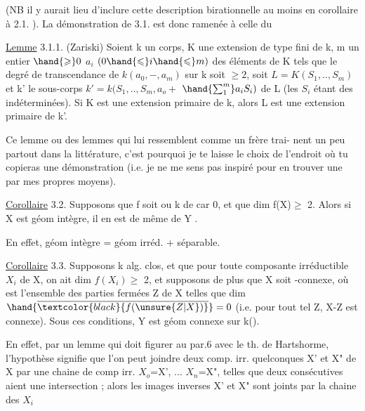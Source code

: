 
(NB il y aurait lieu d'inclure cette description birationnelle au moins
en corollaire à 2.1. ). La démonstration de 3.1. est donc ramenée à
celle du

\uline{Lemme} 3.1.1. (Zariski) Soient k un corps, K une extension de type fini de k, m un entier $\hand{\geqslant} 0$
$a_i$ $(0\hand{\leqslant} i\hand{\leqslant} m)$ des éléments de K  tels que le degré de transcendance de $k(a_0,-,a_m)$ sur k soit $\geqslant 2$,
 soit $L = K(S_1,..,S_m)$ et k' le sous-corps $k'= k(S_1,..,S_m,a_o +$
$\hand{\sum_{1}^{m}}a_iS_i)$ de L (les $S_i$ étant des indéterminées). \hand{,} Si K est une
extension primaire de k, alors L est une extension primaire de k'.

\placedmargin{$|$} Ce lemme\hand{,} ou des lemmes qui lui ressemblent comme un frère\hand{,} trai-%
nent un peu partout dans la littérature, c'est pourquoi je te laisse le
choix de l'endroit où tu copieras une démonstration (i.e. je ne me sens
pas inspiré pour en trouver une par mes propres moyens).

\uline{Corollaire} 3.2. Supposons que f soit   ou k de car 0,
et que dim f(X)$\geqslant$ 2. Alors si X est géom intègre, il en est de même de
Y\hand{$_\eta$} .

En effet, géom intègre = géom irréd. + séparable.

\uline{Corollaire} 3.3. Supposons k alg. clos, et que pour toute composante irréductible $X_i$
de X, on ait dim $f(X_i)$$\geqslant$ 2, et supposons de plus que X soit -connexe,
où  est l'ensemble des parties fermées Z de X telles que dim $\hand{\overline{\textcolor{black}{f(\unsure{Z|X})}}}=0$
(i.e. pour tout tel Z, X-Z est connexe). Sous ces conditions, Y\hand{$_\eta$} est
géom connexe sur k(\hand{$\eta$}).

En effet, par un lemme qui doit figurer au par.6 avec le th. de
Hartshorme, l'hypothèse signifie que l'on peut joindre deux comp. irr.
quelconques X' et X" de X par une chaine de comp irr. $X_o$=X', ...
$X_n$=X", telles que deux consécutives aient une intersection ; alors
les images inverses X'\hand{$_\eta$} et X"\hand{$_\eta$} sont joints par la chaine des $X_{i}$\hand{$_\eta$} 

